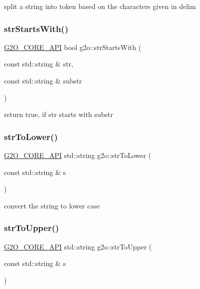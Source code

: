split a string into token based on the characters given in delim \mbox{\label{group__utils_ga98f10a2fabad17ef7ed1534b39eb2bc5}} 
\subsubsection{\texorpdfstring{str\+Starts\+With()}{strStartsWith()}}
{\footnotesize\ttfamily \mbox{\hyperlink{g2o__core__api_8h_a7a8d7648d6f1e26632566f335751d064}{G2\+O\+\_\+\+C\+O\+R\+E\+\_\+\+A\+PI}} bool g2o\+::str\+Starts\+With (\begin{DoxyParamCaption}\item[{const std\+::string \&}]{str,  }\item[{const std\+::string \&}]{substr }\end{DoxyParamCaption})}

return true, if str starts with substr \mbox{\label{group__utils_ga18235ef006dc52e266590591f895157d}} 
\subsubsection{\texorpdfstring{str\+To\+Lower()}{strToLower()}}
{\footnotesize\ttfamily \mbox{\hyperlink{g2o__core__api_8h_a7a8d7648d6f1e26632566f335751d064}{G2\+O\+\_\+\+C\+O\+R\+E\+\_\+\+A\+PI}} std\+::string g2o\+::str\+To\+Lower (\begin{DoxyParamCaption}\item[{const std\+::string \&}]{s }\end{DoxyParamCaption})}

convert the string to lower case \mbox{\label{group__utils_ga70dfb4dd2aeae37635cf2b5bef6321a9}} 
\subsubsection{\texorpdfstring{str\+To\+Upper()}{strToUpper()}}
{\footnotesize\ttfamily \mbox{\hyperlink{g2o__core__api_8h_a7a8d7648d6f1e26632566f335751d064}{G2\+O\+\_\+\+C\+O\+R\+E\+\_\+\+A\+PI}} std\+::string g2o\+::str\+To\+Upper (\begin{DoxyParamCaption}\item[{const std\+::string \&}]{s }\end{DoxyParamCaption})}

